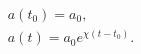 \begin{equation}
\begin{array}{l}
a(t_0)=a_0, \\
a(t)=a_0e^{\chi(t-t_0)}.
\end{array}
\end{equation}

